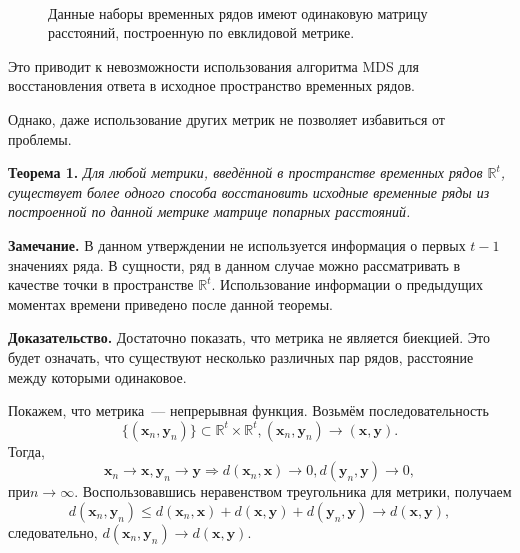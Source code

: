 \documentclass{article}
\begin{document}
\begin{figure}[H]
	\centering
	\\
	\label{fig:fig1}
	\caption{Данные наборы временных рядов имеют одинаковую матрицу расстояний, построенную по евклидовой метрике.}
\end{figure}

Это приводит к невозможности использования алгоритма MDS для восстановления ответа в исходное пространство временных рядов.

Однако, даже использование других метрик не позволяет избавиться от проблемы.

\textbf{Теорема 1.} \textit{Для любой метрики, введённой в пространстве временных рядов $\mathbb{R}^t$, существует более одного способа восстановить исходные временные ряды из построенной по данной метрике матрице попарных расстояний.}

\textbf{Замечание.} В данном утверждении не используется информация о первых $t-1$ значениях ряда. В сущности, ряд в данном случае можно рассматривать в качестве точки в пространстве $\mathbb{R}^t$. Использование информации о предыдущих моментах времени приведено после данной теоремы.

\textbf{Доказательство.} Достаточно показать, что метрика не является биекцией. Это будет означать, что существуют несколько различных пар рядов, расстояние между которыми одинаковое.

Покажем, что метрика~--- непрерывная функция. Возьмём последовательность \[\{(\mathbf{x}_n, \mathbf{y}_n)\} \subset \mathbb{R}^t \times \mathbb{R}^t, (\mathbf{x}_n, \mathbf{y}_n) \to (\mathbf{x}, \mathbf{y}).\] Тогда, \[\mathbf{x}_n\to \mathbf{x}, \mathbf{y}_n\to \mathbf{y} \Rightarrow d(\mathbf{x}_n,\mathbf{x})\to 0 ,d(\mathbf{y}_n,\mathbf{y})\to 0,\] $при n \to \infty.$ Воспользовавшись неравенством треугольника для метрики, получаем \[d(\mathbf{x}_n,\mathbf{y}_n)\leqslant d(\mathbf{x}_n,\mathbf{x})+d(\mathbf{x},\mathbf{y})+d(\mathbf{y}_n,\mathbf{y})\to d(\mathbf{x},\mathbf{y}),\] следовательно, $d(\mathbf{x}_n,\mathbf{y}_n)\to d(\mathbf{x},\mathbf{y})$.
\end{document}
